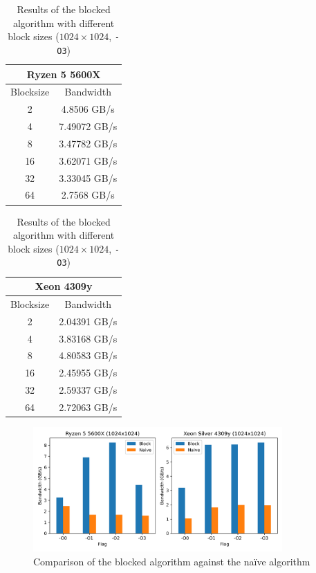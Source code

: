 \documentclass{article}
\begin{document}
\begin{table}[h]
    \centering
    \begin{tabular}{|c|c|}
        \hline
        \multicolumn{2}{|c|}{\textbf{Ryzen 5 5600X}} \\
        \hline
        Blocksize & Bandwidth \\ \hline
        2         & 4.8506 GB/s \\ \hline
        \rowcolor{LightYellow}
        4         & 7.49072 GB/s \\ \hline
        8         & 3.47782 GB/s \\ \hline
        16        & 3.62071 GB/s \\ \hline
        32        & 3.33045 GB/s \\ \hline
        64        & 2.7568 GB/s \\ \hline
    \end{tabular}
    \hspace{2em}
    \begin{tabular}{|c|c|}
        \hline
        \multicolumn{2}{|c|}{\textbf{Xeon 4309y}} \\
        \hline
        Blocksize & Bandwidth \\ \hline
        2         & 2.04391 GB/s \\ \hline
        4         & 3.83168 GB/s \\ \hline
        \rowcolor{LightYellow}
        8         & 4.80583 GB/s \\ \hline
        16        & 2.45955 GB/s \\ \hline
        32        & 2.59337 GB/s \\ \hline
        64        & 2.72063 GB/s \\ \hline
    \end{tabular}
    \caption{Results of the blocked algorithm with different block sizes ($1024 \times 1024$, \texttt{-O3})}
    \label{tab:blocked_results}
\end{table}
\begin{figure}[H]
    \centering
    \includegraphics[width=0.85\textwidth]{report/img/block_vs_naive.png}
    \caption{Comparison of the blocked algorithm against the na\"{i}ve algorithm}
    \label{fig:blocked_comparison}
\end{figure}
\end{document}
